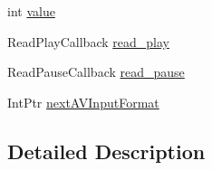 \begin{DoxyCompactItemize}
\item 
int \hyperlink{struct_tao_1_1_f_fmpeg_1_1_f_fmpeg_1_1_a_v_input_format_a84d8cc5b45e34e17f4bba6953e55fa26}{value}
\item 
ReadPlayCallback \hyperlink{struct_tao_1_1_f_fmpeg_1_1_f_fmpeg_1_1_a_v_input_format_a09e8d00a1d04ea1516e373bcd5c73bc8}{read\_\-play}
\item 
ReadPauseCallback \hyperlink{struct_tao_1_1_f_fmpeg_1_1_f_fmpeg_1_1_a_v_input_format_aa4a52343b498d60dd5dcb70e2b4f63cf}{read\_\-pause}
\item 
IntPtr \hyperlink{struct_tao_1_1_f_fmpeg_1_1_f_fmpeg_1_1_a_v_input_format_a8d588a0de035939448935029e0159a7f}{nextAVInputFormat}
\end{DoxyCompactItemize}


\subsection{Detailed Description}



